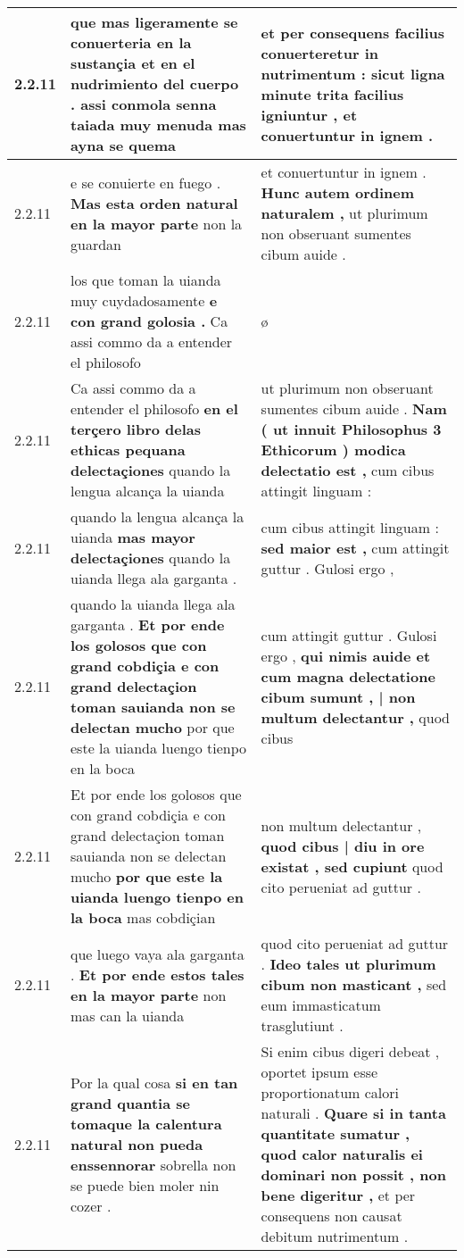 \begin{tabular}{|p{1cm}|p{6.5cm}|p{6.5cm}|}
2.2.11 & que mas ligeramente se conuerteria en la sustançia et en el nudrimiento del cuerpo . \textbf{ assi conmola senna taiada muy menuda } mas ayna se quema & et per consequens facilius conuerteretur in nutrimentum : \textbf{ sicut ligna minute trita facilius igniuntur , } et conuertuntur in ignem . \\\hline
2.2.11 & e se conuierte en fuego . \textbf{ Mas esta orden natural en la mayor parte } non la guardan & et conuertuntur in ignem . \textbf{ Hunc autem ordinem naturalem , } ut plurimum non obseruant sumentes cibum auide . \\\hline
2.2.11 & los que toman la uianda muy cuydadosamente \textbf{ e con grand golosia . } Ca assi commo da a entender el philosofo & ø \\\hline
2.2.11 & Ca assi commo da a entender el philosofo \textbf{ en el terçero libro delas ethicas pequana delectaçiones } quando la lengua alcança la uianda & ut plurimum non obseruant sumentes cibum auide . \textbf{ Nam ( ut innuit Philosophus 3 Ethicorum ) modica delectatio est , } cum cibus attingit linguam : \\\hline
2.2.11 & quando la lengua alcança la uianda \textbf{ mas mayor delectaçiones } quando la uianda llega ala garganta . & cum cibus attingit linguam : \textbf{ sed maior est , } cum attingit guttur . Gulosi ergo , \\\hline
2.2.11 & quando la uianda llega ala garganta . \textbf{ Et por ende los golosos que con grand cobdiçia e con grand delectaçion toman sauianda non se delectan mucho } por que este la uianda luengo tienpo en la boca & cum attingit guttur . Gulosi ergo , \textbf{ qui nimis auide et cum magna delectatione cibum sumunt , | non multum delectantur , } quod cibus \\\hline
2.2.11 & Et por ende los golosos que con grand cobdiçia e con grand delectaçion toman sauianda non se delectan mucho \textbf{ por que este la uianda luengo tienpo en la boca } mas cobdiçian & non multum delectantur , \textbf{ quod cibus | diu in ore existat , sed cupiunt } quod cito perueniat ad guttur . \\\hline
2.2.11 & que luego vaya ala garganta . \textbf{ Et por ende estos tales en la mayor parte } non mas can la uianda & quod cito perueniat ad guttur . \textbf{ Ideo tales ut plurimum cibum non masticant , } sed eum immasticatum trasglutiunt . \\\hline
2.2.11 & Por la qual cosa \textbf{ si en tan grand quantia se tomaque la calentura natural non pueda enssennorar } sobrella non se puede bien moler nin cozer . & Si enim cibus digeri debeat , oportet ipsum esse proportionatum calori naturali . \textbf{ Quare si in tanta quantitate sumatur , quod calor naturalis ei dominari non possit , non bene digeritur , } et per consequens non causat debitum nutrimentum . \\\hline

\end{tabular}
